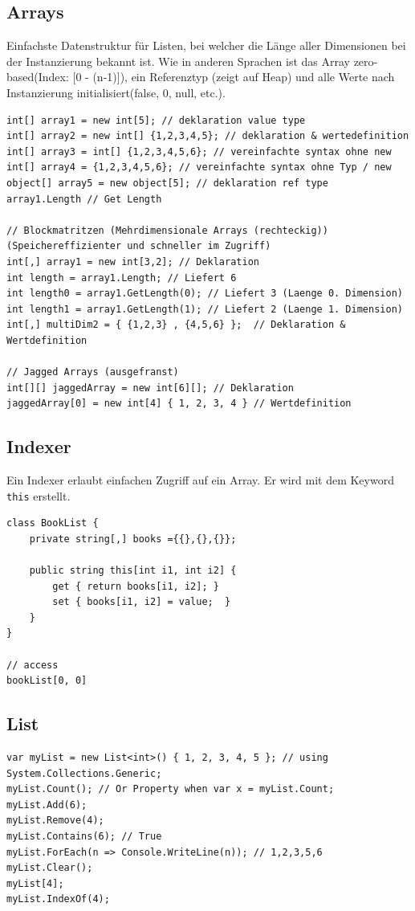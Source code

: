 \documentclass[
a4paper,
oneside,
10pt,
fleqn,
headsepline,
toc=listofnumbered, 
bibliography=totocnumbered]{scrartcl}
\begin{document}
\clearpage

\subsection{Arrays}
Einfachste Datenstruktur für Listen, bei welcher die Länge aller Dimensionen bei der Instanzierung bekannt ist. Wie in anderen Sprachen ist das Array zero-based(Index: [0 - (n-1)]), ein Referenztyp (zeigt auf Heap) und alle Werte nach Instanzierung initialisiert(false, 0, null, etc.).
\begin{lstlisting}
int[] array1 = new int[5]; // deklaration value type
int[] array2 = new int[] {1,2,3,4,5}; // deklaration & wertedefinition
int[] array3 = int[] {1,2,3,4,5,6}; // vereinfachte syntax ohne new
int[] array4 = {1,2,3,4,5,6}; // vereinfachte syntax ohne Typ / new
object[] array5 = new object[5]; // deklaration ref type
array1.Length // Get Length

// Blockmatritzen (Mehrdimensionale Arrays (rechteckig))  (Speichereffizienter und schneller im Zugriff)
int[,] array1 = new int[3,2]; // Deklaration
int length = array1.Length; // Liefert 6
int length0 = array1.GetLength(0); // Liefert 3 (Laenge 0. Dimension)
int length1 = array1.GetLength(1); // Liefert 2 (Laenge 1. Dimension) 
int[,] multiDim2 = { {1,2,3} , {4,5,6} };  // Deklaration & Wertdefinition 

// Jagged Arrays (ausgefranst)
int[][] jaggedArray = new int[6][]; // Deklaration 
jaggedArray[0] = new int[4] { 1, 2, 3, 4 } // Wertdefinition 
\end{lstlisting}

\subsection{Indexer}
Ein Indexer erlaubt einfachen Zugriff auf ein Array. Er wird mit dem Keyword \lstinline|this| erstellt.
\begin{lstlisting}
class BookList {
	private string[,] books ={{},{},{}};

	public string this[int i1, int i2] {
		get { return books[i1, i2]; }
		set { books[i1, i2] = value;  } 
	}
}

// access
bookList[0, 0]
\end{lstlisting}

\subsection{List}
\begin{lstlisting}
var myList = new List<int>() { 1, 2, 3, 4, 5 }; // using System.Collections.Generic;
myList.Count(); // Or Property when var x = myList.Count;
myList.Add(6);
myList.Remove(4);
myList.Contains(6); // True
myList.ForEach(n => Console.WriteLine(n)); // 1,2,3,5,6
myList.Clear();
myList[4];
myList.IndexOf(4);
\end{lstlisting}
\end{document}
